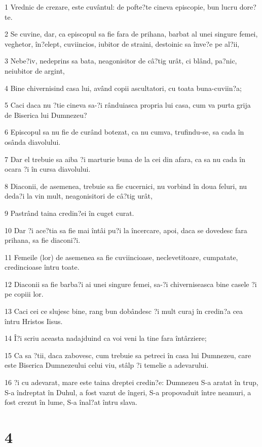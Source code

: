 \par 1 Vrednic de crezare, este cuvântul: de pofte?te cineva episcopie, bun lucru dore?te.
\par 2 Se cuvine, dar, ca episcopul sa fie fara de prihana, barbat al unei singure femei, veghetor, în?elept, cuviincios, iubitor de straini, destoinic sa înve?e pe al?ii,
\par 3 Nebe?iv, nedeprins sa bata, neagonisitor de câ?tig urât, ci blând, pa?nic, neiubitor de argint,
\par 4 Bine chivernisind casa lui, având copii ascultatori, cu toata buna-cuviin?a;
\par 5 Caci daca nu ?tie cineva sa-?i rânduiasca propria lui casa, cum va purta grija de Biserica lui Dumnezeu?
\par 6 Episcopul sa nu fie de curând botezat, ca nu cumva, trufindu-se, sa cada în osânda diavolului.
\par 7 Dar el trebuie sa aiba ?i marturie buna de la cei din afara, ca sa nu cada în ocara ?i în cursa diavolului.
\par 8 Diaconii, de asemenea, trebuie sa fie cucernici, nu vorbind în doua feluri, nu deda?i la vin mult, neagonisitori de câ?tig urât,
\par 9 Pastrând taina credin?ei în cuget curat.
\par 10 Dar ?i ace?tia sa fie mai întâi pu?i la încercare, apoi, daca se dovedesc fara prihana, sa fie diaconi?i.
\par 11 Femeile (lor) de asemenea sa fie cuviincioase, neclevetitoare, cumpatate, credincioase întru toate.
\par 12 Diaconii sa fie barba?i ai unei singure femei, sa-?i chiverniseasca bine casele ?i pe copiii lor.
\par 13 Caci cei ce slujesc bine, rang bun dobândesc ?i mult curaj în credin?a cea întru Hristos Iisus.
\par 14 Î?i scriu aceasta nadajduind ca voi veni la tine fara întârziere;
\par 15 Ca sa ?tii, daca zabovesc, cum trebuie sa petreci în casa lui Dumnezeu, care este Biserica Dumnezeului celui viu, stâlp ?i temelie a adevarului.
\par 16 ?i cu adevarat, mare este taina dreptei credin?e: Dumnezeu S-a aratat în trup, S-a îndreptat în Duhul, a fost vazut de îngeri, S-a propovaduit între neamuri, a fost crezut în lume, S-a înal?at întru slava.

\chapter{4}

